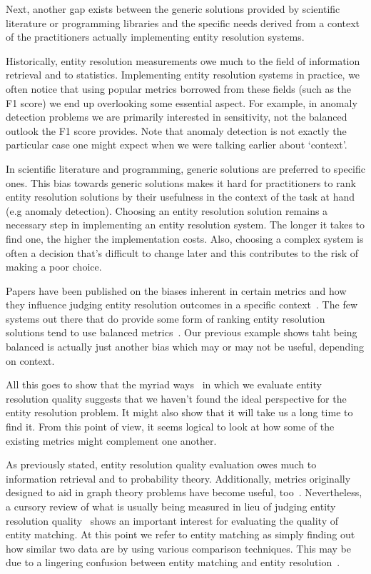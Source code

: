 Next, another gap exists between the generic solutions provided by scientific
literature or programming libraries and the specific needs derived from a
context of the practitioners actually implementing entity resolution
systems.

Historically, entity resolution measurements owe much to the field of
information retrieval and to statistics.
Implementing entity resolution systems in practice, we often notice that
using popular metrics borrowed from these fields (such as the F1 score) we
end up overlooking some essential aspect.
For example, in anomaly detection problems we are primarily interested in
sensitivity, not the balanced outlook the F1 score provides.
Note that anomaly detection is not exactly the particular case one might
expect when we were talking earlier about `context'.

In scientific literature and programming, generic solutions are preferred to
specific ones.
This bias towards generic solutions makes it hard for practitioners to rank
entity resolution solutions by their usefulness in the context of the task
at hand (e.g anomaly detection).
Choosing an entity resolution solution remains a necessary step in
implementing an entity resolution system.
The longer it takes to find one, the higher the implementation costs.
Also, choosing a complex system is often a decision that's difficult to
change later and this contributes to the risk of making a poor choice.

Papers have been published on the biases inherent in certain metrics
and how they influence judging entity resolution outcomes in a specific
context~\cite{Goga2015}.
The few systems out there that do provide some form of ranking entity
resolution solutions tend to use balanced metrics~\cite{papwithcode2019}.
Our previous example shows taht being balanced is actually just another bias
which may or may not be useful, depending on context.

All this goes to show that the myriad ways~\cite{hitesh2012} in which we
evaluate entity resolution quality suggests that we haven't found the ideal
perspective for the entity resolution problem.
It might also show that it will take us a long time to find it.
From this point of view, it seems logical to look at how some of the existing
metrics might complement one another.

As previously stated, entity resolution quality evaluation owes much to
information retrieval and to probability theory.
Additionally, metrics originally designed to aid in graph theory problems have
become useful, too~\cite{hitesh2012,Kon19}.
Nevertheless, a cursory review of what is usually being measured in lieu of
judging entity resolution quality~\cite{fever2009,Men10,Goga2015} shows an
important interest for evaluating the quality of entity matching.
At this point we refer to entity matching as simply finding out how similar two
data are by using various comparison techniques.
This may be due to a lingering confusion between entity matching and entity
resolution~\cite{Tal11}.

